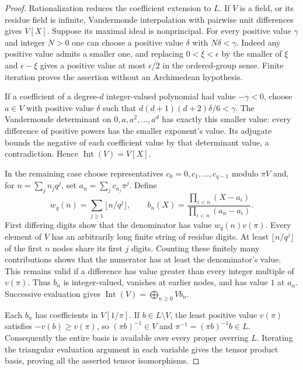 \begin{proof}
Rationalization reduces the coefficient extension to $L$.
If $V$ is a field, or its residue field is infinite, Vandermonde
interpolation with pairwise unit differences gives $V[X]$.
Suppose its maximal ideal is nonprincipal. For every positive
value $\gamma$ and integer $N>0$ one can choose a positive value
$\delta$ with $N\delta<\gamma$. Indeed any positive value admits
a smaller one, and replacing $0<\xi<\epsilon$ by the smaller of
$\xi$ and $\epsilon-\xi$ gives a positive value at most
$\epsilon/2$ in the ordered-group sense. Finite iteration proves
the assertion without an Archimedean hypothesis.

If a coefficient of a degree-$d$ integer-valued polynomial had
value $-\gamma<0$, choose $a\in V$ with positive value $\delta$
such that $d(d+1)(d+2)\delta/6<\gamma$. The Vandermonde determinant
on $0,a,a^2,\ldots,a^d$ has exactly this smaller value: every
difference of positive powers has the smaller exponent's value.
Its adjugate bounds the negative of each coefficient value by
that determinant value, a contradiction. Hence
$\operatorname{Int}(V)=V[X]$.

In the remaining case choose representatives
$c_0=0,c_1,\ldots,c_{q-1}$ modulo $\pi V$ and, for
$n=\sum_jn_jq^j$, set $a_n=\sum_jc_{n_j}\pi^j$. Define
\[
 w_q(n)=\sum_{j\ge1}\lfloor n/q^j\rfloor,
 \qquad
 b_n(X)=\frac{\prod_{i<n}(X-a_i)}{\prod_{i<n}(a_n-a_i)}.
\]
First differing digits show that the denominator has value
$w_q(n)v(\pi)$. Every element of $V$ has an arbitrarily long
finite string of residue digits. At least $\lfloor n/q^j\rfloor$
of the first $n$ nodes share its first $j$ digits. Counting these
finitely many contributions shows that the numerator has at
least the denominator's value. This remains valid if a difference
has value greater than every integer multiple of $v(\pi)$.
Thus $b_n$ is integer-valued, vanishes at earlier nodes, and has
value $1$ at $a_n$. Successive evaluation gives
$\operatorname{Int}(V)=\bigoplus_{n\ge0}Vb_n$.

Each $b_n$ has coefficients in $V[1/\pi]$. If $b\in L\setminus V$,
the least positive value $v(\pi)$ satisfies $-v(b)\ge v(\pi)$,
so $(\pi b)^{-1}\in V$ and $\pi^{-1}=(\pi b)^{-1}b\in L$.
Consequently the entire basis is available over every proper
overring $L$. Iterating the triangular evaluation argument in
each variable gives the tensor product basis, proving all the
asserted tensor isomorphisms.
\end{proof}

